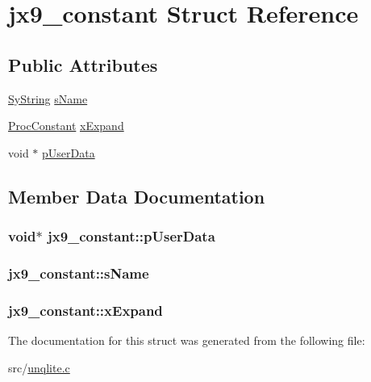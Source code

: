 \hypertarget{structjx9__constant}{\section{jx9\-\_\-constant Struct Reference}
\label{dc/dc7/structjx9__constant}
}
\subsection*{Public Attributes}
\begin{DoxyCompactItemize}
\item 
\hyperlink{struct_sy_string}{Sy\-String} \hyperlink{structjx9__constant_af450bf710e1944be00caeab6467b9a16}{s\-Name}
\item 
\hyperlink{unqlite_8c_a36597dc510fe171854fecbf97587814e}{Proc\-Constant} \hyperlink{structjx9__constant_ae8f2bc24a41d45b0e7ee3a2c24263d4a}{x\-Expand}
\item 
void $\ast$ \hyperlink{structjx9__constant_a660f8599e8163420b084e019677bb819}{p\-User\-Data}
\end{DoxyCompactItemize}


\subsection{Member Data Documentation}
\hypertarget{structjx9__constant_a660f8599e8163420b084e019677bb819}{
\subsubsection[{p\-User\-Data}]{\setlength{\rightskip}{0pt plus 5cm}void$\ast$ jx9\-\_\-constant\-::p\-User\-Data}}\label{dc/dc7/structjx9__constant_a660f8599e8163420b084e019677bb819}
\hypertarget{structjx9__constant_af450bf710e1944be00caeab6467b9a16}{
\subsubsection[{s\-Name}]{ jx9\-\_\-constant\-::s\-Name}}\label{dc/dc7/structjx9__constant_af450bf710e1944be00caeab6467b9a16}
\hypertarget{structjx9__constant_ae8f2bc24a41d45b0e7ee3a2c24263d4a}{
\subsubsection[{x\-Expand}]{ jx9\-\_\-constant\-::x\-Expand}}\label{dc/dc7/structjx9__constant_ae8f2bc24a41d45b0e7ee3a2c24263d4a}


The documentation for this struct was generated from the following file\-:\begin{DoxyCompactItemize}
\item 
src/\hyperlink{unqlite_8c}{unqlite.\-c}\end{DoxyCompactItemize}
